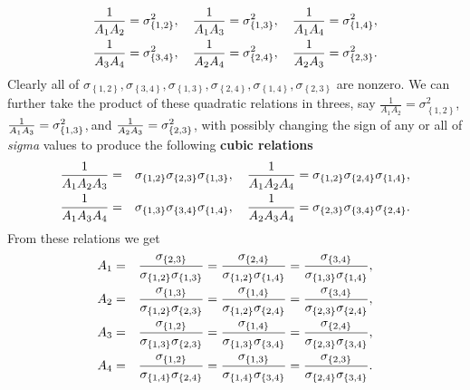 \documentclass{unswthesis}
\begin{document}
\begin{align}
\frac{1}{A_{1}A_{2}}& =\sigma _{\left\{ 1,2\right\} }^{2},\quad \frac{1}{%
A_{1}A_{3}}=\sigma _{\left\{ 1,3\right\} }^{2},\quad \frac{1}{A_{1}A_{4}}%
=\sigma _{\left\{ 1,4\right\} }^{2},  \label{Quadratic Relations} \\
\frac{1}{A_{3}A_{4}}& =\sigma _{\left\{ 3,4\right\} }^{2},\quad \frac{1}{%
A_{2}A_{4}}=\sigma _{\left\{ 2,4\right\} }^{2},\quad \frac{1}{A_{2}A_{3}}%
=\sigma _{\left\{ 2,3\right\} }^{2}.
\end{align}%
\qquad Clearly all of $\sigma _{\left\{ 1,2\right\} },\sigma _{\left\{
3,4\right\} },\sigma _{\left\{ 1,3\right\} },\sigma _{\left\{ 2,4\right\}
},\sigma _{\left\{ 1,4\right\} },\sigma _{\left\{ 2,3\right\} }$ are
nonzero. We can further take the product of these quadratic relations in
threes, say $\frac{1}{A_{1}A_{2}}=\sigma _{\left\{ 1,2\right\} }^{2}$,$\frac{%
1}{A_{1}A_{3}}=\sigma _{\left\{ 1,3\right\} }^{2}$,$\ $and $\frac{1}{%
A_{2}A_{3}}=\sigma _{\left\{ 2,3\right\} }^{2}$, with possibly changing the
sign of any or all of \textit{sigma} values to produce the following \textbf{%
cubic relations}%
\begin{eqnarray}
\frac{1}{A_{1}A_{2}A_{3}} &=&\sigma _{\left\{ 1,2\right\} }\sigma _{\left\{
2,3\right\} }\sigma _{\left\{ 1,3\right\} },\quad \frac{1}{A_{1}A_{2}A_{4}}%
=\sigma _{\left\{ 1,2\right\} }\sigma _{\left\{ 2,4\right\} }\sigma
_{\left\{ 1,4\right\} },  \label{Cubic Relations} \\
\frac{1}{A_{1}A_{3}A_{4}} &=&\sigma _{\left\{ 1,3\right\} }\sigma _{\left\{
3,4\right\} }\sigma _{\left\{ 1,4\right\} },\quad \frac{1}{A_{2}A_{3}A_{4}}%
=\sigma _{\left\{ 2,3\right\} }\sigma _{\left\{ 3,4\right\} }\sigma
_{\left\{ 2,4\right\} }.  \notag
\end{eqnarray}%
From these relations we get%
\begin{eqnarray*}
A_{1} &=&\frac{\sigma _{\left\{ 2,3\right\} }}{\sigma _{\left\{ 1,2\right\}
}\sigma _{\left\{ 1,3\right\} }}=\frac{\sigma _{\left\{ 2,4\right\} }}{%
\sigma _{\left\{ 1,2\right\} }\sigma _{\left\{ 1,4\right\} }}=\frac{\sigma
_{\left\{ 3,4\right\} }}{\sigma _{\left\{ 1,3\right\} }\sigma _{\left\{
1,4\right\} }}, \\
A_{2} &=&\frac{\sigma _{\left\{ 1,3\right\} }}{\sigma _{\left\{ 1,2\right\}
}\sigma _{\left\{ 2,3\right\} }}=\frac{\sigma _{\left\{ 1,4\right\} }}{%
\sigma _{\left\{ 1,2\right\} }\sigma _{\left\{ 2,4\right\} }}=\frac{\sigma
_{\left\{ 3,4\right\} }}{\sigma _{\left\{ 2,3\right\} }\sigma _{\left\{
2,4\right\} }}, \\
A_{3} &=&\frac{\sigma _{\left\{ 1,2\right\} }}{\sigma _{\left\{ 1,3\right\}
}\sigma _{\left\{ 2,3\right\} }}=\frac{\sigma _{\left\{ 1,4\right\} }}{%
\sigma _{\left\{ 1,3\right\} }\sigma _{\left\{ 3,4\right\} }}=\frac{\sigma
_{\left\{ 2,4\right\} }}{\sigma _{\left\{ 2,3\right\} }\sigma _{\left\{
3,4\right\} }}, \\
A_{4} &=&\frac{\sigma _{\left\{ 1,2\right\} }}{\sigma _{\left\{ 1,4\right\}
}\sigma _{\left\{ 2,4\right\} }}=\frac{\sigma _{\left\{ 1,3\right\} }}{%
\sigma _{\left\{ 1,4\right\} }\sigma _{\left\{ 3,4\right\} }}=\frac{\sigma
_{\left\{ 2,3\right\} }}{\sigma _{\left\{ 2,4\right\} }\sigma _{\left\{
3,4\right\} }}.
\end{eqnarray*}%
\end{document}

